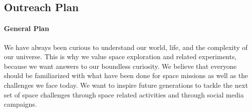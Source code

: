 \documentclass{article}
\begin{document}
\subsection{Outreach Plan}
\paragraph{General Plan}
We have always been curious to understand our world, life, and the complexity of our universe. This is why we value space exploration and related experiments, because we want answers to our boundless curiosity. We believe that everyone should be familiarized with what have been done for space missions as well as the challenges we face today. We want to inspire future generations to tackle the next set of space challenges through space related activities and through social media campaigns.
\end{document}
